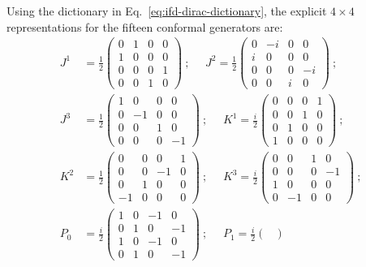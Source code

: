 \documentclass[foundations,article,submit,pdftex,moreauthors]{Definitions/mdpi}
\begin{document}
Using the dictionary in Eq.~\eqref{eq:ifd-dirac-dictionary}, the explicit $4\times 4$ representations for the fifteen conformal generators are:
\begin{align*}
    J^{1}&=\frac{1}{2}\begin{pmatrix}
    0&1&0&0\\
    1&0&0&0\\
    0&0&0&1\\
    0&0&1&0
    \end{pmatrix}~;~~~~~~J^{2}=\frac{1}{2}\begin{pmatrix}
    0&-i&0&0\\
    i&0&0&0\\
    0&0&0&-i\\
    0&0&i&0
    \end{pmatrix}~;\\
    J^{3}&=\frac{1}{2}\begin{pmatrix}
    1&0&0&0\\
    0&-1&0&0\\
    0&0&1&0\\
    0&0&0&-1
    \end{pmatrix}~;~~~~~~
    K^{1}=\frac{i}{2}\begin{pmatrix}
    0&0&0&1\\
    0&0&1&0\\
    0&1&0&0\\
    1&0&0&0
    \end{pmatrix}~;\\
    K^{2}&=\frac{1}{2}\begin{pmatrix}
    0&0&0&1\\
    0&0&-1&0\\
    0&1&0&0\\
    -1&0&0&0
    \end{pmatrix}~;~~~~~~K^{3}=\frac{i}{2}\begin{pmatrix}
    0&0&1&0\\
    0&0&0&-1\\
    1&0&0&0\\
    0&-1&0&0
    \end{pmatrix}~;\\
    P_0&=\frac{i}{2}\begin{pmatrix}
    1&0&-1&0\\
    0&1&0&-1\\
    1&0&-1&0\\
    0&1&0&-1
    \end{pmatrix}~;~~~~~~P_1=\frac{i}{2}\begin{pmatrix}

\end{pmatrix}
\end{align*}
\end{document}
